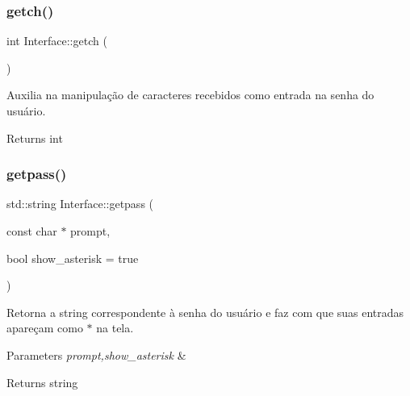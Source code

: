 \subsubsection{\texorpdfstring{getch()}{getch()}}
{\footnotesize\ttfamily int Interface\+::getch (\begin{DoxyParamCaption}{ }\end{DoxyParamCaption})}



Auxilia na manipulação de caracteres recebidos como entrada na senha do usuário. 

\begin{DoxyReturn}{Returns}
int 
\end{DoxyReturn}
\mbox{\label{namespace_interface_aeb08764caefdb64e384ce67ce1b2ed88}} 
\subsubsection{\texorpdfstring{getpass()}{getpass()}}
{\footnotesize\ttfamily std\+::string Interface\+::getpass (\begin{DoxyParamCaption}\item[{const char $\ast$}]{prompt,  }\item[{bool}]{show\+\_\+asterisk = {\ttfamily true} }\end{DoxyParamCaption})}



Retorna a string correspondente à senha do usuário e faz com que suas entradas apareçam como \textquotesingle{}$\ast$\textquotesingle{} na tela. 


\begin{DoxyParams}{Parameters}
{\em prompt,show\+\_\+asterisk} & \\
\hline
\end{DoxyParams}
\begin{DoxyReturn}{Returns}
string 
\end{DoxyReturn}
